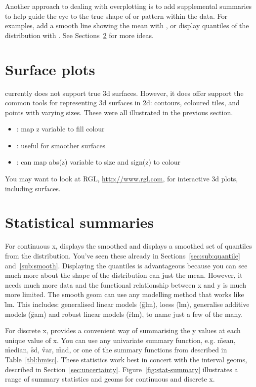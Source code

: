 Another approach to dealing with overplotting is to add supplemental summaries to help guide the eye to the true shape of or pattern within the data.  For examples, add a smooth line showing the mean with , or display quantiles of the distribution with .  See Sections~\ref{sec:summary} for more ideas.

\section{Surface plots}
\label{sec:surface}

\ggplot currently does not support true 3d surfaces.  However, it does offer support the common tools for representing 3d surfaces in 2d: contours, coloured tiles, and points with varying sizes.  These were all illustrated in the previous section.

\begin{itemize}
  \item {}: map z variable to fill colour
  \item {}: useful for smoother surfaces
  \item {}: can map abs(z) variable to size and sign(z) to colour
\end{itemize}

You may want to look at RGL, \url{http://www.rgl.com}, for interactive 3d plots, including surfaces.

\section{Statistical summaries}
\label{sec:summary}

For continuous x,  displays the smoothed and  displays a smoothed set of quantiles from the distribution.  You've seen these already in Sections~\ref{sec:sub:quantile} and~\ref{sub:smooth}.  Displaying the quantiles is advantageous because you can see much more about the shape of the distribution can just the mean.  However, it needs much more data and the functional relationship between x and y is much more limited.  The smooth geom can use any modelling method that works like \f{lm}.  This includes: generalised linear models (\f{glm}), loess (\f{lm}), generalise additive models (\f{gam}) and robust linear models (\f{rlm}), to name just a few of the many.  

For discrete x,  provides a convenient way of summarising the y values at each unique value of x.  You can use any univariate summary function, e.g. \f{mean}, \f{median}, \f{sd}, \f{var}, \f{mad}, or one of the summary functions from  described in Table~\ref{tbl:hmisc}.  These statistics work best in concert with the interval geoms, described in Section~\ref{sec:uncertainty}.  Figure~\ref{fig:stat-summary} illustrates a range of summary statistics and geoms for continuous and discrete x.

